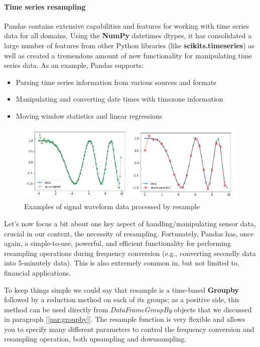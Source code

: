 \paragraph{Time series resampling}
Pandas contains extensive capabilities and features for working with time series data for all domains. Using the \textbf{NumPy} datetimes dtypes, it has consolidated a large number of features from other Python libraries (like \textbf{scikits.timeseries}) as well as created a tremendous amount of new functionality for manipulating time series data.
As an example, Pandas supports:
\begin{itemize}
    \item Parsing time series information from various sources and formats
    \item Manipulating and converting date times with timezone information
    \item Moving window statistics and linear regressions
\end{itemize}
\begin{figure}[ht]
    \centering
    \includegraphics[width=\linewidth]{content/chapter_3/images/up-down-sample.png}
    \caption{Examples of signal waveform data processed by resample}\label{fig:up and down sampling}
\end{figure}
Let's now focus a bit about one key aspect of handling/manipulating sensor data, crucial in our context, the necessity of resampling.
Fortunately, Pandas has, once again, a simple-to-use, powerful, and efficient functionality for performing resampling operations during frequency conversion (e.g., converting secondly data into 5-minutely data). This is also extremely common in, but not limited to, financial applications.

To keep things simple we could say that resample is a time-based \textbf{Groupby} followed by a reduction method on each of its groups; as a positive side, this method can be used directly from \textit{DataFrameGroupBy} objects that we discussed in paragraph [\ref{par:groupby}].
The resample function is very flexible and allows you to specify many different parameters to control the frequency conversion and resampling operation, both upsampling and downsampling.
